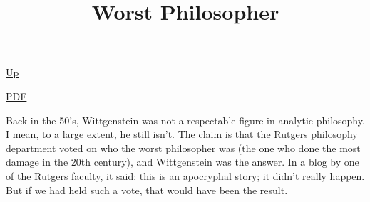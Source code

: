 \documentclass[12pt,a4paper]{report}
\begin{document}
 \href{doc/jokes/academic.html}{Up} 

 \href{doc/jokes/academic/WorstPhilosopher.pdf}{PDF} 
\title{Worst Philosopher}
Back in the 50's, Wittgenstein was not a respectable figure in analytic
philosophy. I mean, to a large extent, he still isn't. The claim is that the
Rutgers philosophy department voted on who the worst philosopher was (the one
who done the most damage in the 20th century), and Wittgenstein was the answer.
In a blog by one of the Rutgers faculty, it said: this is an apocryphal story;
it didn't really happen. But if we had held such a vote, that would have been
the result.
\end{document}
